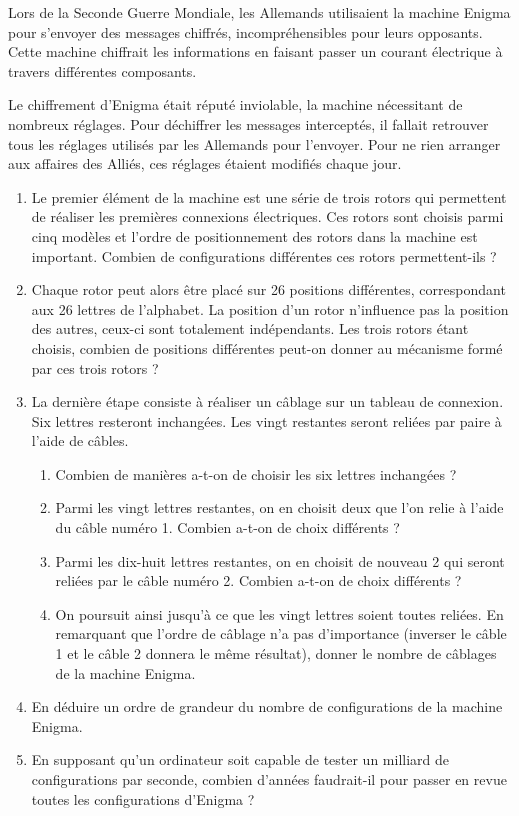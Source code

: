 \documentclass[11pt,fleqn, openany]{book} %
\begin{document}
\begin{exercise}[topic=comb04]Lors de la Seconde Guerre Mondiale, les Allemands utilisaient la machine Enigma pour s'envoyer des messages chiffrés, incompréhensibles pour leurs opposants. Cette machine chiffrait les informations en faisant passer un courant électrique à travers différentes composants. 

Le chiffrement d'Enigma était réputé inviolable, la machine nécessitant de nombreux réglages. Pour déchiffrer les messages interceptés, il fallait retrouver tous les réglages utilisés par les Allemands pour l'envoyer. Pour ne rien arranger aux affaires des Alliés, ces réglages étaient modifiés chaque jour.

\begin{enumerate}
\item Le premier élément de la machine est une série de trois rotors qui permettent de réaliser les premières connexions électriques. Ces rotors sont choisis parmi cinq modèles et l'ordre de positionnement des rotors dans la machine est important. Combien de configurations différentes ces rotors permettent-ils ?
\item Chaque rotor peut alors être placé sur 26 positions différentes, correspondant aux 26 lettres de l'alphabet. La position d'un rotor n'influence pas la position des autres, ceux-ci sont totalement indépendants. Les trois rotors étant choisis, combien de positions différentes peut-on donner au mécanisme formé par ces trois rotors ?
\item La dernière étape consiste à réaliser un câblage sur un tableau de connexion. Six lettres resteront inchangées. Les vingt restantes seront reliées par paire à l'aide de câbles.
\begin{enumerate}
\item Combien de manières a-t-on de choisir les six lettres inchangées ?
\item Parmi les vingt lettres restantes, on en choisit deux que l'on relie à l'aide du câble numéro 1. Combien a-t-on de choix différents ?
\item Parmi les dix-huit lettres restantes, on en choisit de nouveau 2 qui seront reliées par le câble numéro 2. Combien a-t-on de choix différents ?
\item On poursuit ainsi jusqu'à ce que les vingt lettres soient toutes reliées. En remarquant que l'ordre de câblage n'a pas d'importance (inverser le câble 1 et le câble 2 donnera le même résultat), donner le nombre de câblages de la machine Enigma.
\end{enumerate}
\item En déduire un ordre de grandeur du nombre de configurations de la machine Enigma.
\item En supposant qu'un ordinateur soit capable de tester un milliard de configurations par seconde, combien d'années faudrait-il pour passer en revue toutes les configurations d'Enigma ?
\end{enumerate}\end{exercise}
\end{document}
